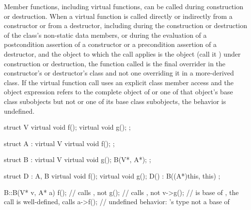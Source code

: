 \pnum
{}%
%
%
%
Member functions, including virtual functions, can be called
during construction or destruction.
When a virtual function is called directly or indirectly from a constructor
or from a destructor,
including during the construction or destruction of the class's non-static data
members,
or during the evaluation of
a postcondition assertion of a constructor or
a precondition assertion of a destructor,
and the object to which the call applies is the object (call it ) under construction or
destruction,
the function called is the
final overrider in the constructor's or destructor's class and not one
overriding it in a more-derived class.
If the virtual function call uses an explicit class member access
and the object expression refers to
the complete object of  or one of that object's base class subobjects
but not  or one of its base class subobjects, the behavior
is undefined.
%
%
%
%
%
\begin{example}
\begin{codeblock}
struct V {
  virtual void f();
  virtual void g();
};

struct A : virtual V {
  virtual void f();
};

struct B : virtual V {
  virtual void g();
  B(V*, A*);
};

struct D : A, B {
  virtual void f();
  virtual void g();
  D() : B((A*)this, this) { }
};

B::B(V* v, A* a) {
  f();              // calls , not 
  g();              // calls , not 
  v->g();           //  is base of , the call is well-defined, calls 
  a->f();           // undefined behavior: 's type not a base of 
}
\end{codeblock}
\end{example}

